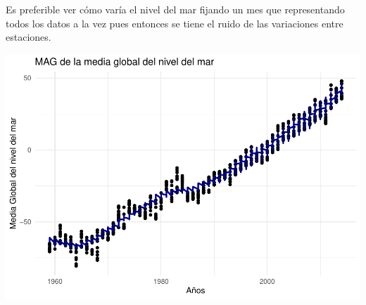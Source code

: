 \documentclass[12pt,a4paper,]{book}
\numberwithin{dummy}{section}
\theoremstyle{ocrenumbox}
\theoremstyle{blacknumex}
\theoremstyle{blacknumbox}
\theoremstyle{ocrenum}
\theoremstyle{ocrenum}
\begin{document}
Es preferible ver cómo varía el nivel del mar fijando un mes que
representando todos los datos a la vez pues entonces se tiene el ruido
de las variaciones entre estaciones.

\begin{center}\includegraphics[width=0.95\linewidth]{figurasR/unnamed-chunk-42-1} \end{center}




\end{document}
